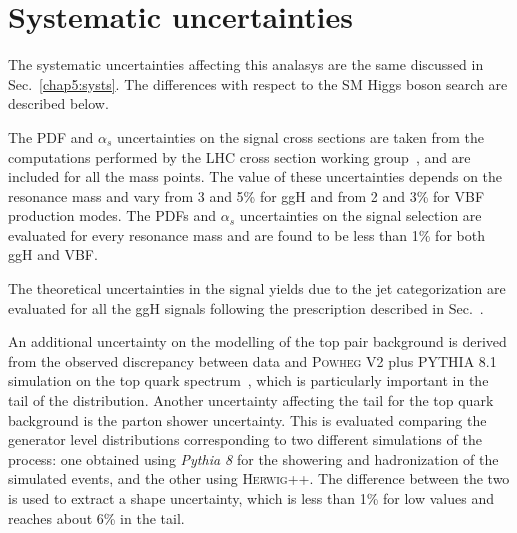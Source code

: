 \section{Systematic uncertainties}\label{chap6:Systematics}

The systematic uncertainties affecting this analasys are the same discussed in Sec.~\ref{chap5:systs}. The differences with respect to the SM Higgs boson search are described below.

The PDF and $\alpha_s$ uncertainties on the signal cross sections are taken from the computations performed by the LHC cross section working group~\cite{YRtmp}, and are included for all the mass points. The value of these uncertainties depends on the resonance mass and vary from 3 and 5\% for ggH and from 2 and 3\% for VBF production modes. The PDFs and $\alpha_{s}$ uncertainties on the signal selection are evaluated for every resonance mass and are found to be less than 1\% for both ggH and VBF.

The theoretical uncertainties in the signal yields due to the jet categorization are evaluated for all the ggH signals following the prescription described in Sec.~\cite{subsec:stewart-tackman}.

An additional uncertainty on the modelling of the top pair background is derived from the observed discrepancy between data and \textsc{Powheg V2} plus \textsc{PYTHIA 8.1} simulation on the top quark \pt spectrum~\cite{Khachatryan:2015oqa}, which is particularly important in the tail of the \mti distribution. Another uncertainty affecting the \mti tail for the top quark background is the parton shower uncertainty. This is evaluated comparing the generator level \mti distributions corresponding to two different simulations of the \ttbar process: one obtained using \textit{Pythia 8} for the showering and hadronization of the simulated events, and the other using \textsc{Herwig++}. The difference between the two is used to extract a shape uncertainty, which is less than 1\% for low \mti values and reaches about 6\% in the \mti tail.






